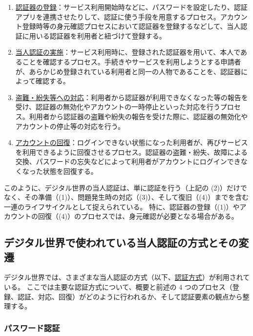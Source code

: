 \documentclass[uplatex]{jsarticle}
\def\label#1{}%
\begin{document}
\begin{dfn}[当人認証におけるプロセス]\label{dfn:authenticator-phases}
\begin{enumerate}
\item \underline{認証器の登録}：サービス利用開始時などに、パスワードを設定したり、認証アプリを連携させたりして、認証に使う手段を用意するプロセス。アカウント登録時等の身元確認プロセスにおいて認証器を登録するなどして、当人認証に用いる認証器を利用者と紐づけて登録する。
\item \underline{当人認証の実施}：サービス利用時に、登録された認証器を用いて、本人であることを確認するプロセス。手続きやサービスを利用しようとする申請者が、あらかじめ登録されている利用者と同一の人物であることを、認証器によって確認する。
\item \underline{盗難・紛失等への対応}：利用者から認証器が利用できなくなった等の報告を受け、認証器の無効化やアカウントの一時停止といった対応を行うプロセス。利用者から認証器の盗難や紛失の報告を受けた際に、認証器の無効化やアカウントの停止等の対応を行う。
\item \underline{アカウントの回復}：ログインできない状態になった利用者が、再びサービスを利用できるように回復させるプロセス。認証器の盗難・紛失、故障による交換、パスワードの忘失などによって利用者がアカウントにログインできなくなった状態を回復する。
\end{enumerate}
\end{dfn}

このように、デジタル世界の当人認証は、単に認証を行う（上記の (2)）だけでなく、その準備（(1)）、問題発生時の対応（(3)）、そして復旧（(4)）までを含む一連のライフサイクルとして捉えられている。
特に、認証器の登録（(1)）やアカウントの回復（(4)）のプロセスでは、身元確認が必要となる場合がある。

\subsection{デジタル世界で使われている当人認証の方式とその変遷}\label{subsec:ch2-authn-methods}

デジタル世界では、さまざまな当人認証の方式（以下、\underline{認証方式}）が利用されている。
ここでは主要な認証方式について、概要と前述の 4 つのプロセス（登録、認証、対応、回復）がどのように行われるか、そして認証要素の観点から整理する。

\subsubsection{パスワード認証}
\end{document}

